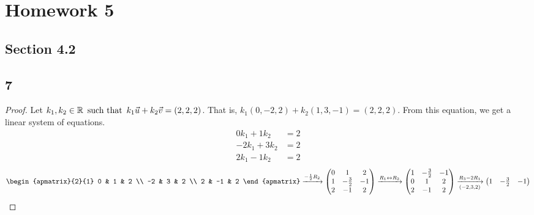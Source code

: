 \documentclass{article}
\begin{document}
\section*{Homework 5}

\subsection*{Section 4.2}

\subsection*{7}
\begin{enumerate}
    \begin{proof}
        Let $k_1,k_2 \in \mathbb{R} \operatorname{~\text{such that}~} k_1\vec{u} + k_2\vec{v} = (2,2,2)$. That is, $k_1(0,-2,2) + k_2(1,3,-1) = (2,2,2)$. From this equation, we get a linear system of equations.
        \begin{align*}
            0k_1 + 1k_2  & = 2 \\
            -2k_1 + 3k_2 & = 2 \\
            2k_1 - 1k_2  & = 2
        \end{align*}
        \[
            \begin{apmatrix}{2}{1}
                0  & 1  & 2 \\
                -2 & 3  & 2 \\
                2  & -1 & 2
            \end{apmatrix} \xrightarrow{-\frac{1}{2}R_2}
            \begin{pmatrix}
                0 & 1            & 2  \\
                1 & -\frac{3}{2} & -1 \\
                2 & -1           & 2
            \end{pmatrix} \xrightarrow{R_1 \leftrightarrow R_2}
            \begin{pmatrix}
                1 & -\frac{3}{2} & -1 \\
                0 & 1            & 2  \\
                2 & -1           & 2
            \end{pmatrix} \xrightarrow[(-2, 3, 2)]{R_3 - 2R_1}
            \begin{pmatrix}
                1 & -\frac{3}{2} & -1 \\

\end{pmatrix}\]
\end{proof}
\end{enumerate}
\end{document}

